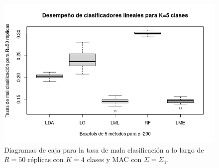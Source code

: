 \documentclass{report}
\begin{document}
\begin{figure} [h]
\begin{multicols}{2}
  		\caption*{$p=100$}
  		\includegraphics[width=\linewidth]{5_clases_p200_sigma_II}\par 
  		\caption*{$p=200$}
  		
  	\end{multicols}
  	\caption{ Diagramas de caja para la tasa de mala clasificación  a lo largo de $R=50$ réplicas con $K=4$ clases y MAC con $\Sigma=\Sigma_1$. }
  	\label{boxk5alta}
  \end{figure}
  
\end{document}
